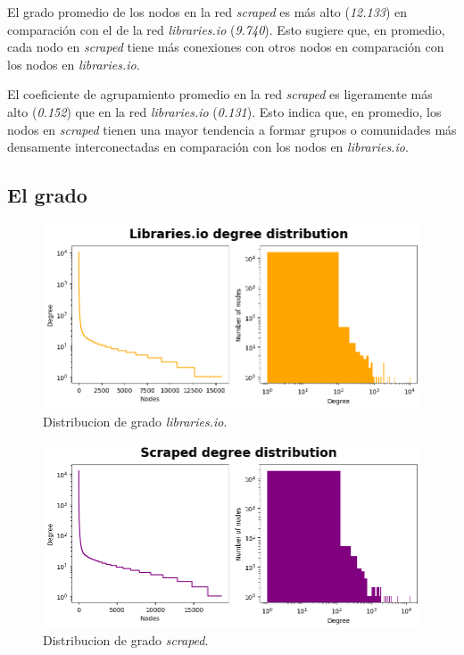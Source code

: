 El grado promedio de los nodos en la red \textit{scraped} es más alto (\textit{12.133}) en
comparación con el de la red \textit{libraries.io} (\textit{9.740}). Esto sugiere que, en promedio, cada nodo
en \textit{scraped} tiene más conexiones con otros nodos en comparación con los nodos en \textit{libraries.io}.

El coeficiente de agrupamiento promedio en la red \textit{scraped} es
ligeramente más alto (\textit{0.152}) que en la red \textit{libraries.io} (\textit{0.131}). Esto indica que,
en promedio, los nodos en \textit{scraped} tienen una mayor tendencia a formar grupos o comunidades más densamente
interconectadas en comparación con los nodos en \textit{libraries.io}.

\subsection{El grado}

\begin{figure}[h!]
    \begin{center}
        \includegraphics[width=1\textwidth]{img/cran/distribucion_grado.png}
        \caption{Distribucion de grado \textit{libraries.io}.}
        \label{fig:cran_degree_distribution}
    \end{center}
\end{figure}

\begin{figure}[h!]
    \begin{center}
        \includegraphics[width=1\textwidth]{img/cran/distribucion_grado2.png}
        \caption{Distribucion de grado \textit{scraped}.}
        \label{fig:cran_degree_distribution_scraped}
    \end{center}
\end{figure}

